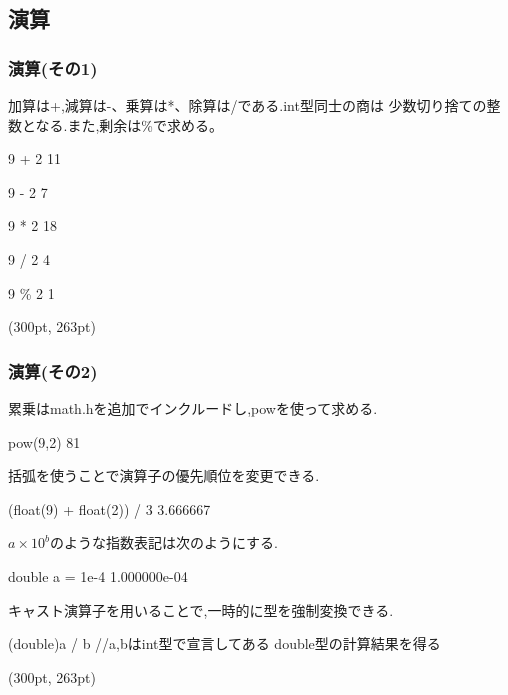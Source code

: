 \documentclass[dvipdfmx]{beamer}
\begin{document}
\subsection{演算}
\begin{frame}[t,fragile, label=15]
    \frametitle{演算(その1)}
    加算は+,減算は-、乗算は*、除算は/である.int型同士の商は
    少数切り捨ての整数となる.また,剰余は\%で求める。
    \begin{block}{9 + 2}
        11
    \end{block}
    \begin{block}{9 - 2}
        7
    \end{block}
    \begin{block}{9 * 2}
        18  
    \end{block}
    \begin{block}{9 / 2}
        4   
    \end{block}
    \begin{block}{9 \% 2}
        1   
    \end{block}
    \begin{textblock*}{0.3\linewidth}(300pt, 263pt)
    \hyperlink{14}{}
    \space
    \hyperlink{16}{}
    \end{textblock*}
\end{frame}

\begin{frame}[t, label=16]
    \frametitle{演算(その2)}
    累乗はmath.hを追加でインクルードし,powを使って求める.
    \begin{block}{pow(9,2)}
        81
    \end{block}
    括弧を使うことで演算子の優先順位を変更できる.
    \begin{block}{(float(9) + float(2)) / 3}
        3.666667
    \end{block}
    $a\times 10^{b}$のような指数表記は次のようにする.
    \begin{block}{double a = 1e-4}
        1.000000e-04
    \end{block}
    キャスト演算子を用いることで,一時的に型を強制変換できる.
    \begin{block}{(double)a / b //a,bはint型で宣言してある}
        double型の計算結果を得る
    \end{block}
    \begin{textblock*}{0.3\linewidth}(300pt, 263pt)
    \hyperlink{15}{}
    \space
    \hyperlink{17}{}
    \end{textblock*}
\end{frame}
\end{document}
